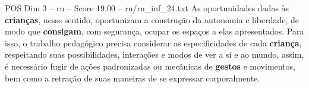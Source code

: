 \begin{textsample}{POS Dim 3 – rn – Score 19.00 – rn/rn\_inf\_24.txt}
As oportunidades dadas às \textbf{crianças}, nesse sentido, oportunizam a construção da autonomia e liberdade, de modo que \textbf{consigam}, com segurança, ocupar os espaços a elas apresentados.
Para isso, o trabalho pedagógico precisa considerar as especificidades de cada \textbf{criança}, respeitando suas possibilidades, interações e modos de ver a si e ao mundo, assim, é necessário fugir de ações padronizadas ou mecânicas de \textbf{gestos} e movimentos, bem como a retração de suas maneiras de se expressar corporalmente.

\end{textsample}
